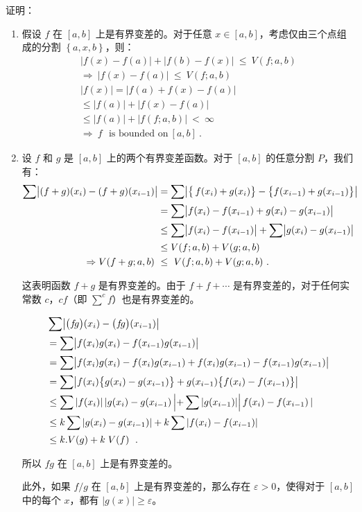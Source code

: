 \begin{example}{证明：}
\begin{enumerate}
\item 假设 $f$ 在 $[a,b]$ 上是有界变差的。对于任意 $x\in[a,b]$，考虑仅由三个点组成的分割 $\left\{a,x,b\right\}$，则：
\begin{align} \left|f(x)-f(a)\right|+\left|f(b)-f(x)\right|\ \leq\ V(f;a,b) \\ \Rightarrow\ \left|f(x)-f(a)\right|\ \leq\ V(f;a,b) \\ \left|f(x)\right|=\left|f(a)+f(x)-f(a)\right| \\ \leq\left|f(a)\right|+\left|f(x)-f(a)\right| \\ \leq\left|f(a)\right|+\left|f(f;a,b)\right|\ <\ \infty \\ \Rightarrow\ f\ \ \ \text{is bounded on}\ [a,b] ~. \end{align}
\item 设 $f$ 和 $g$ 是 $[a,b]$ 上的两个有界变差函数。对于 $[a,b]$ 的任意分割 $P$，我们有：\begin{align} \sum\bigl{|}(f+g)(x_{i})-(f+g)(x_{i-1})\bigr{|}&=\sum\bigl{|}\bigl{\{}\,f(x_{i})+g(x_{i})\bigr{\}}-\bigl{\{}f(x_{i-1})+g(x_{i-1})\bigr{\}}\bigr{|} \\ &=\sum\bigl{|}f(x_{i})-f(x_{i-1})+g(x_{i})-g(x_{i-1})\bigr{|} \\ &\leq\sum\bigl{|}f(x_{i})-f(x_{i-1})\bigr{|}+\sum\bigl{|}g(x_{i})-g(x_{i-1})\bigr{|} \\ &\leq V(f;a,b)+V(g;a,b) \\ \Rightarrow V(f+g;a,b)\ &\leq\ V(f;a,b)+V(g;a,b) ~.\end{align}

这表明函数 $f+g$ 是有界变差的。由于 $f+f+\cdots$ 是有界变差的，对于任何实常数 $c$，$cf$（即 $\sum^c f$）也是有界变差的。

\begin{align} &\sum\bigl{|}\bigl{(}f\!g\bigr{)}(x_{i})-\bigl{(}f\!g\bigr{)}(x_{i-1})\bigr{|} \\ &=\sum\bigl{|}f(x_{i})g(x_{i})-f(x_{i-1})g(x_{i-1})\bigr{|} \\ &=\sum\bigl{|}f(x_{i})g(x_{i})-f(x_{i})g(x_{i-1})+f(x_{i})g(x_{i-1})-f(x_{i-1})g(x_{i-1})\bigr{|} \\ &=\sum\bigl{|}f(x_{i})\bigl{\{}g(x_{i})-g(x_{i-1})\bigr{\}}+g(x_{i-1})\bigl{\{}f(x_{i})-f(x_{i-1})\bigr{\}}\bigr{|}\\&\leq\sum\left|f(x_{i})\right||g(x_{i})-g(x_{i-1})\left|+\sum\left|g(x_{i-1})\right|\right|f(x_{i})-f(x_{i-1})\left|\right. \\ &\leq k\sum\left|g(x_{i})-g(x_{i-1})\right|+k\sum\left|f(x_{i})-f(x_{i-1})\right| \\ &\leq k.V(g)+k\left.V(f)\right. ~.\end{align}

所以 $fg$ 在 $[a,b]$ 上是有界变差的。

此外，如果 $f/g$ 在 $[a,b]$ 上是有界变差的，那么存在 $\varepsilon>0$，使得对于 $[a,b]$ 中的每个 $x$，都有 $|g(x)|\geq\varepsilon$。

\end{enumerate}
\end{example}
